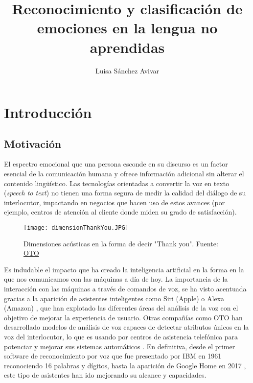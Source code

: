 \documentclass[11pt,a4paper,spanish]{book}
\begin{document}
	\title{Reconocimiento y clasificación de emociones en la lengua no aprendidas}
	\author{Luisa Sánchez Avivar}
	
	
	\mainmatter
	\chapter{Introducción}
	
	
	\section{Motivación}
	
	
	El espectro emocional que una persona esconde en su discurso es un factor esencial de la comunicación humana y ofrece información adicional sin alterar el contenido lingüístico. Las tecnologías orientadas a convertir la voz en texto (\emph{speech to text}) no tienen una forma segura de medir la calidad del diálogo de su interlocutor, impactando en negocios que hacen uso de estos avances (por ejemplo, centros de atención al cliente donde miden su grado de satisfacción).
	
	\begin{figure}[H]
		\centering
		\texttt{[image: dimensionThankYou.JPG]} 
		\caption{Dimensiones acústicas en la forma de decir "Thank you". Fuente: \href{https://otosystemsinc.medium.com/introducing-oto-99199a9b2c1b}{OTO}}
		\label{fig:emociones_tess}
	\end{figure}
	
	Es indudable el impacto que ha creado la inteligencia artificial en la forma en la que nos comunicamos con las máquinas a día de hoy. La importancia de la interacción con las máquinas a través de comandos de voz, se ha visto acentuada gracias a la aparición de asistentes inteligentes como Siri (Apple) \cite{Siri} o Alexa (Amazon) \cite{amazonAlexa} , que han explotado las diferentes áreas del análisis de la voz con el objetivo de mejorar la experiencia de usuario. Otras compañías como OTO han desarrollado modelos de análisis de voz capaces de detectar atributos únicos en la voz del interlocutor, lo que es usando por centros de asistencia telefónica para potenciar y mejorar sus sistemas automáticos \cite{OTOPersonalAssistance}.
	En definitiva, desde el primer software de reconocimiento por voz que fue presentado por IBM en 1961 reconociendo 16 palabras y dígitos\cite{IBMser}, hasta la aparición de Google Home en 2017 \cite{GHome2017}, este tipo de asistentes han ido mejorando su alcance y capacidades.\\
	
\end{document}
